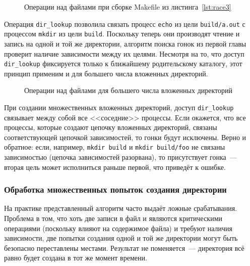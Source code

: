 \begin{figure}[H]
    \centering
    
    \caption{Операции над файлами при сборке Makefile из листинга~\ref{lst:race3}}
    \label{fig:dirlookup-demo}
\end{figure}

Операция \texttt{dir\_lookup} позволила связать процесс \texttt{echo} из цели \texttt{build/a.out} с процессом \texttt{mkdir} из цели \texttt{build}. Поскольку теперь они производят чтение и запись на одной и той же директории, алгоритм поиска гонок из первой главы проверит наличие зависимости между их целями. Несмотря на то, что доступ \texttt{dir\_lookup} фиксируется только к ближайшему родительскому каталогу, этот принцип применим и для большего числа вложенных директорий.

\begin{figure}[H]
    \centering
    
    \caption{Операции над файлами для большего числа вложенных директорий}
    \label{fig:dirlookup-demo-deep}
\end{figure}

При создании множественных вложенных директорий, доступ \texttt{dir\_lookup} связывает между собой все <<соседние>> процессы. Если окажется, что все процессы, которые создают цепочку вложенных директорий, связаны соответствующей цепочкой зависимостей, то гонки будут исключены. Верно и обратное: если, например, \texttt{mkdir build} и \texttt{mkdir build/foo} не связаны зависимостью (цепочка зависимостей разорвана), то присутствует гонка~--- вторая цель может исполниться раньше первой, что приведёт к ошибке.

\subsubsection{Обработка множественных попыток создания директории}

На практике представленный алгоритм часто выдаёт ложные срабатывания. Проблема в том, что хоть две записи в файл и являются критическими операциями (поскольку влияют на содержимое файла) и требуют наличия зависимости, две попытки создания одной и той же директории могут быть безопасно переставлены местами. Результат не поменяется~--- директория всё равно будет создана в тот же момент времени.

\begin{figure}[H]

\end{figure}

